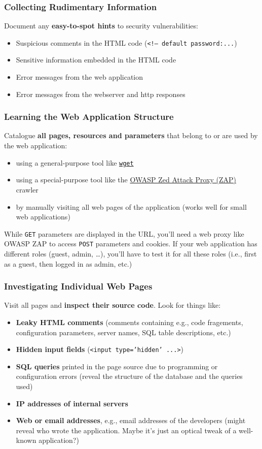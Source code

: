 \documentclass[aspectratio=169]{beamer}
\begin{document}
\begin{frame}
    \frametitle{Collecting Rudimentary Information}
    Document any \textbf{easy-to-spot hints} to security vulnerabilities:
    \begin{itemize}
        \item Suspicious comments in the HTML code (\texttt{<!-- default password:...})
        \item Sensitive information embedded in the HTML code
        \item Error messages from the web application
        \item Error messages from the webserver and http responses
    \end{itemize}
\end{frame}


\begin{frame}
    \frametitle{Learning the Web Application Structure}
    Catalogue \textbf{all pages, resources and parameters} that belong to or are used by the web application:
    \begin{itemize}
        \item using a general-purpose tool like \href{https://www.gnu.org/software/wget/}{\texttt{wget}}
        \item using a special-purpose tool like the \href{https://www.zaproxy.org/}{OWASP Zed Attack Proxy (ZAP)} crawler
        \item by manually visiting all web pages of the application (works well for small web applications)
    \end{itemize}
    \vfill
    While \texttt{GET} parameters are displayed in the URL, you'll need a web proxy like OWASP ZAP to access \texttt{POST} parameters and cookies.
    \vfill
    If your web application has different roles (guest, admin, \ldots), you'll have to test it for all these roles (i.e., first as a guest, then logged in as admin, etc.)
\end{frame}

\begin{frame}
    \frametitle{Investigating Individual Web Pages}
    Visit all pages and \textbf{inspect their source code}. Look for things like:
    \begin{itemize}
        \item \textbf{Leaky HTML comments} (comments containing e.g., code fragements, configuration parameters, server names, SQL table descriptions, etc.)
        \item \textbf{Hidden input fields} (\texttt{<input type='hidden' ...>})
        \item \textbf{SQL queries} printed in the page source due to programming or configuration errors (reveal the structure of the database and the queries used)
        \item \textbf{IP addresses of internal servers}
        \item \textbf{Web or email addresses}, e.g., email addresses of the developers (might reveal who wrote the application. Maybe it's just an optical tweak of a well-known application?)
    \end{itemize} 
    

\end{frame}
\end{document}
